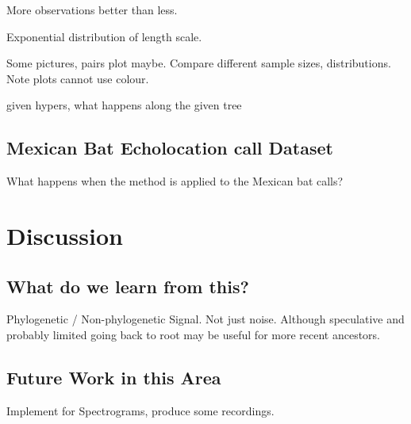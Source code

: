 \documentclass[wsdraft]{ws-rv9x6} %
\begin{document}
More observations better than less.

Exponential distribution of length scale.

Some pictures, pairs plot maybe. Compare different sample sizes, distributions. Note plots cannot use colour.

given hypers, what happens along the given tree

\subsection{Mexican Bat Echolocation call Dataset}

What happens when the method is applied to the Mexican bat calls?

\section{Discussion}

\subsection{What do we learn from this?}

Phylogenetic / Non-phylogenetic Signal. Not just noise. Although speculative and probably limited going back to root may be useful for more recent ancestors.

\subsection{Future Work in this Area}

Implement for Spectrograms, produce some recordings.





\end{document}
